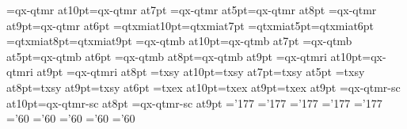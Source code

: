 \ifx\PT\undefined{}\fi%
\ifx\altg\undefined\def\altg{}\fi
\ifx\fontenc\undefined\def\fontenc{qx}\fi
\font\tenrm=\fontenc-qtmr at10\PT \font\sevenrm=\fontenc-qtmr at7\PT 
\font\fiverm=\fontenc-qtmr at5\PT \font\eightrm=\fontenc-qtmr at8\PT 
\font\ninerm=\fontenc-qtmr at9\PT \font\sixrm=\fontenc-qtmr at6\PT
%
\font\teni=qtxmi\altg\space at10\PT \font\seveni=qtxmi\altg\space at7\PT 
\font\fivei=qtxmi\altg\space at5\PT \font\sixi=qtxmi\altg\space at6\PT  
\font\eighti=qtxmi\altg\space at8\PT \font\ninei=qtxmi\altg\space at9\PT
%
\font\tenbf=\fontenc-qtmb at10\PT \font\sevenbf=\fontenc-qtmb at7\PT 
\font\fivebf=\fontenc-qtmb at5\PT \font\sixbf=\fontenc-qtmb at6\PT  
\font\eightbf=\fontenc-qtmb at8\PT \font\ninebf=\fontenc-qtmb at9\PT
%
\font\tenit=\fontenc-qtmri at10\PT \font\nineit=\fontenc-qtmri at9\PT 
\font\eightit=\fontenc-qtmri at8\PT 
%
\font\tensy=txsy at10\PT \font\sevensy=txsy at7\PT \font\fivesy=txsy at5\PT
\font\eightsy=txsy at8\PT \font\ninesy=txsy at9\PT \font\sixsy=txsy at6\PT
%
\font\tenex=txex at10\PT \font\eightex=txex at9\PT \font\nineex=txex at9\PT
%
\font\tencsc=\fontenc-qtmr-sc at10\PT \font\eightcsc=\fontenc-qtmr-sc at8\PT 
\font\ninecsc=\fontenc-qtmr-sc at9\PT
%
\skewchar\teni='177 \skewchar\ninei='177 \skewchar\eighti='177
\skewchar\seveni='177 \skewchar\fivei='177
\skewchar\tensy='60 \skewchar\ninesy='60 \skewchar\eightsy='60
\skewchar\sevensy='60 \skewchar\fivesy='60
%
\def\eightpoint{\def\rm{\fam0\eightrm}%
\textfont0\eightrm \scriptfont0=\sixrm \scriptscriptfont0=\fiverm
\textfont1\eighti  \scriptfont1=\sixi  \scriptscriptfont1=\fivei
\textfont2\eightsy \scriptfont2=\sixsy   \scriptscriptfont2=\fivesy
\textfont3\eightex \scriptfont3=\eightex \scriptscriptfont3=\eightex
\def\mit{\fam1}\def\oldstyle{\fam1\eighti}\def\cal{\fam2}%
\textfont\itfam=\eightit \def\it{\fam\itfam\eightit}%
\textfont\bffam=\eightbf \scriptfont\bffam=\sixbf\scriptscriptfont\bffam=\fivebf
\def\bf{\fam\bffam\eightbf}%
\let\sc=\eightcsc
\normalbaselineskip=10\PT
\setbox\strutbox=\hbox{\vrule height7.6\PT depth 2.4\PT width0pt}%
\normalbaselines\rm}
\def\ninepoint{\def\rm{\fam0\ninerm}%
\textfont0=\ninerm \scriptfont0=\sixrm \scriptscriptfont0=\fiverm
\textfont1=\ninei  \scriptfont1=\sixi  \scriptscriptfont1=\fivei
\textfont2=\ninesy \scriptfont2=\sixsy  \scriptscriptfont2=\fivesy
\textfont3=\nineex \scriptfont3=\nineex \scriptscriptfont3=\nineex
\def\mit{\fam1}\def\oldstyle{\fam1\ninei}\def\cal{\fam2}%
\textfont\itfam=\nineit \def\it{\fam\itfam\nineit}%
\textfont\bffam=\ninebf \scriptfont\bffam=\sixbf \scriptscriptfont\bffam=\fivebf
\def\bf{\fam\bffam\ninebf}%
\let\sc=\ninecsc
\normalbaselineskip=11\PT
\setbox\strutbox=\hbox{\vrule height8\PT depth3\PT width0\PT}%
\normalbaselines\rm}
